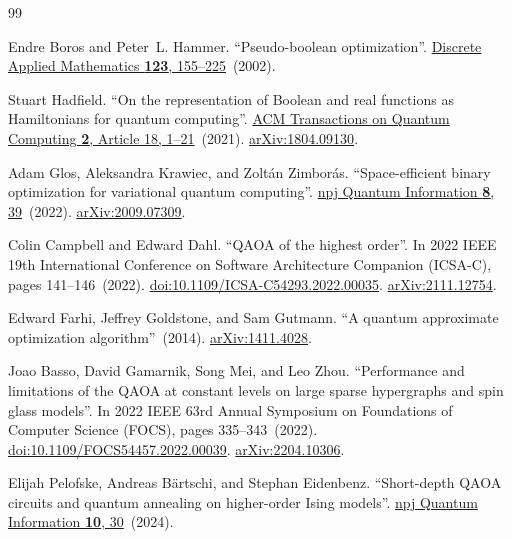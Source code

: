 \documentclass[a4paper,onecolumn,11pt,unpublished]{quantumarticle}
\theoremstyle{remark}
\begin{document}
\begin{thebibliography}{99}

Endre Boros and Peter~L. Hammer.
\newblock ``Pseudo-boolean optimization''.
\newblock \href{https://dx.doi.org/10.1016/S0166-218X(01)00341-9}{Discrete Applied Mathematics {\bf 123}, 155--225}~(2002).

Stuart Hadfield.
\newblock ``On the representation of Boolean and real functions as Hamiltonians for quantum computing''.
\newblock \href{https://dx.doi.org/10.1145/3478519}{ACM Transactions on Quantum Computing {\bf 2}, Article 18, 1--21}~(2021).
\newblock \href{http://arxiv.org/abs/1804.09130}{arXiv:1804.09130}.

Adam Glos, Aleksandra Krawiec, and Zolt{\'a}n Zimbor{\'a}s.
\newblock ``Space-efficient binary optimization for variational quantum computing''.
\newblock \href{https://dx.doi.org/10.1038/s41534-022-00546-y}{npj Quantum Information {\bf 8}, 39}~(2022).
\newblock \href{http://arxiv.org/abs/2009.07309}{arXiv:2009.07309}.

Colin Campbell and Edward Dahl.
\newblock ``QAOA of the highest order''.
\newblock In 2022 IEEE 19th International Conference on Software Architecture Companion (ICSA-C), pages 141--146~(2022).
\newblock \href{https://dx.doi.org/10.1109/ICSA-C54293.2022.00035}{doi:10.1109/ICSA-C54293.2022.00035}.
\newblock \href{http://arxiv.org/abs/2111.12754}{arXiv:2111.12754}.

Edward Farhi, Jeffrey Goldstone, and Sam Gutmann.
\newblock ``A quantum approximate optimization algorithm''~(2014).
\newblock \href{http://arxiv.org/abs/1411.4028}{arXiv:1411.4028}.

Joao Basso, David Gamarnik, Song Mei, and Leo Zhou.
\newblock ``Performance and limitations of the QAOA at constant levels on large sparse hypergraphs and spin glass models''.
\newblock In 2022 IEEE 63rd Annual Symposium on Foundations of Computer Science (FOCS), pages 335--343~(2022).
\newblock \href{https://dx.doi.org/10.1109/FOCS54457.2022.00039}{doi:10.1109/FOCS54457.2022.00039}.
\newblock \href{http://arxiv.org/abs/2204.10306}{arXiv:2204.10306}.

Elijah Pelofske, Andreas B{\"a}rtschi, and Stephan Eidenbenz.
\newblock ``Short-depth QAOA circuits and quantum annealing on higher-order Ising models''.
\newblock \href{https://dx.doi.org/10.1038/s41534-024-00825-w}{npj Quantum Information {\bf 10}, 30}~(2024).


\end{thebibliography}
\end{document}
